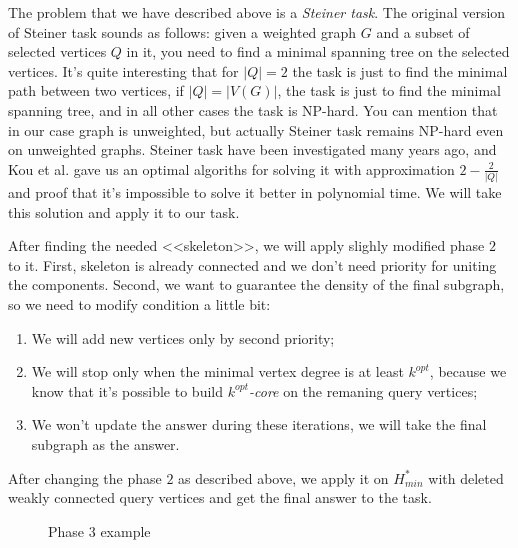 The problem that we have described above is a \textit{Steiner task}. The original version of Steiner task sounds as follows: given a weighted graph $G$ and a subset of selected vertices $Q$ in it, you need to find a minimal spanning tree on the selected vertices. It's quite interesting that for $|Q| = 2$ the task is just to find the minimal path between two vertices, if $|Q| = |V(G)|$, the task is just to find the minimal spanning tree, and in all other cases the task is NP-hard. You can mention that in our case graph is unweighted, but actually Steiner task remains NP-hard even on unweighted graphs. Steiner task have been investigated many years ago, and Kou et al. \cite{Kou81} gave us an optimal algoriths for solving it with approximation $2 - \frac{2}{|Q|}$ and proof that it's impossible to solve it better in polynomial time. We will take this solution and apply it to our task.

After finding the needed <<skeleton>>, we will apply slighly modified phase $2$ to it. First, skeleton is already connected and we don't need priority for uniting the components. Second, we want to guarantee the density of the final subgraph, so we need to modify condition a little bit:

\begin{enumerate}
  \item We will add new vertices only by second priority;
  \item We will stop only when the minimal vertex degree is at least $k^{opt}$, because we know that it's possible to build \textit{$k^{opt}$-core} on the remaning query vertices;
  \item We won't update the answer during these iterations, we will take the final subgraph as the answer.
\end{enumerate}

After changing the phase $2$ as described above, we apply it on $H_{min}^*$ with deleted weakly connected query vertices and get the final answer to the task.

\begin{figure}[!h]
\caption{Phase $3$ example}\label{phase3-example}
\centering
  \begin{center}
  \end{center}
\end{figure}

